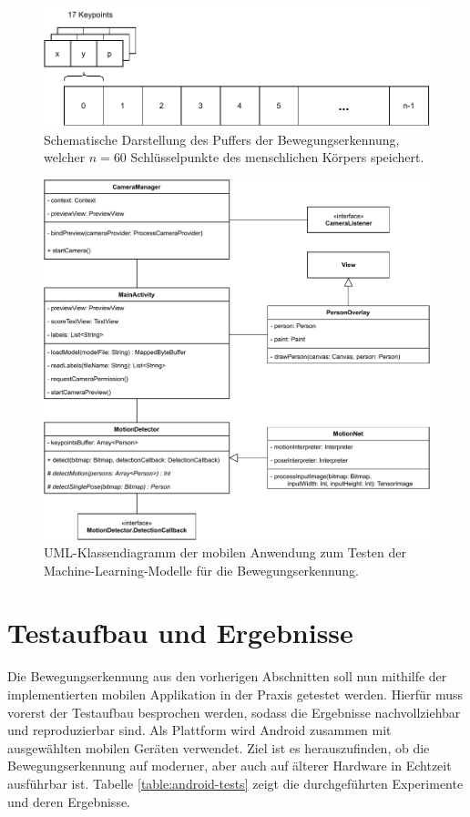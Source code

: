 \begin{figure}
    \includegraphics[width=\textwidth]{images/camera_frame_buffer.pdf}
    \caption{Schematische Darstellung des Puffers der Bewegungserkennung,
    welcher $n = 60$ Schlüsselpunkte des menschlichen Körpers speichert.}
    \label{fig:camera-frame-buffer}
\end{figure}

\begin{figure}
    \includegraphics[width=\textwidth]{images/app_uml.pdf}
    \caption{UML-Klassendiagramm der mobilen Anwendung zum Testen der
    Machine-Learning-Modelle für die Bewegungserkennung.}
    \label{fig:uml-app}
\end{figure}

\section{Testaufbau und Ergebnisse}
Die Bewegungserkennung aus den vorherigen Abschnitten soll nun mithilfe der
implementierten mobilen Applikation in der Praxis getestet werden. Hierfür muss
vorerst der Testaufbau besprochen werden, sodass die Ergebnisse nachvollziehbar
und reproduzierbar sind. Als Plattform wird Android zusammen mit ausgewählten
mobilen Geräten verwendet. Ziel ist es herauszufinden, ob die Bewegungserkennung
auf moderner, aber auch auf älterer Hardware in Echtzeit ausführbar ist. Tabelle \ref{table:android-tests} zeigt die durchgeführten Experimente und deren Ergebnisse.

